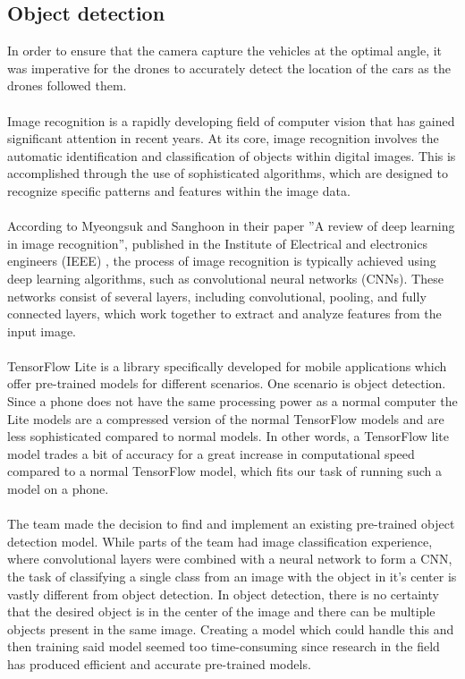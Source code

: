 \subsection{Object detection} \label{Image tracking}
In order to ensure that the camera capture the vehicles at the optimal angle, it was imperative for the drones to accurately detect the location of the cars as the drones followed them.  
\\ \\
Image recognition is a rapidly developing field of computer vision that has gained significant attention in recent years. At its core, image recognition involves the automatic identification and classification of objects within digital images. This is accomplished through the use of sophisticated algorithms, which are designed to recognize specific patterns and features within the image data.
\\ \\
According to Myeongsuk and Sanghoon in their paper ''A review of deep learning in image recognition'', published in the Institute of Electrical and electronics engineers (IEEE) \cite{Pak2018ARecognition}, the process of image recognition is typically achieved using deep learning algorithms, such as convolutional neural networks (CNNs). These networks consist of several layers, including convolutional, pooling, and fully connected layers, which work together to extract and analyze features from the input image.
\\ \\
TensorFlow Lite is a library specifically developed for mobile applications which offer pre-trained models for different scenarios. One scenario is object detection. Since a phone does not have the same processing power as a normal computer the Lite models are a compressed version of the normal TensorFlow models and are less sophisticated compared to normal models. In other words, a TensorFlow lite model trades a bit of accuracy for a great increase in computational speed compared to a normal TensorFlow model, which fits our task of running such a model on a phone. 
\\ \\
The team made the decision to find and implement an existing pre-trained object detection model. While parts of the team had image classification experience, where convolutional layers were combined with a neural network to form a CNN, the task of classifying a single class from an image with the object in it's center is vastly different from object detection. In object detection, there is no certainty that the desired object is in the center of the image and there can be multiple objects present in the same image. Creating a model which could handle this and then training said model seemed too time-consuming since research in the field has produced efficient and accurate pre-trained models.
